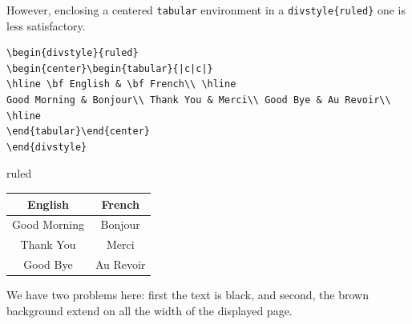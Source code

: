 However, enclosing a centered
\texttt{tabular} environment in a \texttt{divstyle\{ruled\}} one 
is less satisfactory.
\begin{verbatim}
\begin{divstyle}{ruled}
\begin{center}\begin{tabular}{|c|c|}
\hline \bf English & \bf French\\ \hline
Good Morning & Bonjour\\ Thank You & Merci\\ Good Bye & Au Revoir\\ \hline
\end{tabular}\end{center}
\end{divstyle}
\end{verbatim}
\begin{htmlonly}
\begin{divstyle}{ruled}
\begin{center}\begin{tabular}{|c|c|}
\hline \bf English & \bf French\\ \hline
Good Morning & Bonjour\\ Thank You & Merci\\ Good Bye & Au Revoir\\
\hline
\end{tabular}\end{center}
\end{divstyle}
\end{htmlonly}
We have two problems here: first the text is black, and second,
the brown background extend on all the width of the displayed page.

